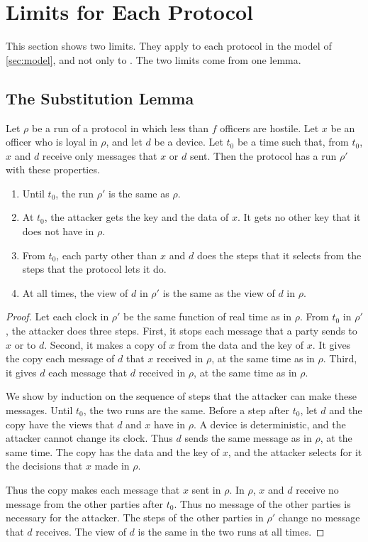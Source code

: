 \section{Limits for Each Protocol}
\label{sec:limits}

This section shows two limits. They apply to each protocol in the model of
\cref{sec:model}, and not only to \sys{}. The two limits come from one lemma.

\subsection{The Substitution Lemma}

\begin{lem}[Substitution]
\label{lem:subst}
Let $\rho$ be a run of a protocol in which less than $f$ officers are hostile. Let $x$ be
an officer who is loyal in $\rho$, and let $d$ be a device. Let $t_0$ be a time such that,
from $t_0$, $x$ and $d$ receive only messages that $x$ or $d$ sent. Then the protocol has
a run $\rho'$ with these properties.
\begin{enumerate}
  \item Until $t_0$, the run $\rho'$ is the same as $\rho$.
  \item At $t_0$, the attacker gets the key and the data of $x$. It gets no other key that
  it does not have in $\rho$.
  \item From $t_0$, each party other than $x$ and $d$ does the steps that it selects from
  the steps that the protocol lets it do.
  \item At all times, the view of $d$ in $\rho'$ is the same as the view of $d$ in $\rho$.
\end{enumerate}
\end{lem}

\begin{proof}
Let each clock in $\rho'$ be the same function of real time as in $\rho$. From $t_0$ in
$\rho'$, the attacker does three steps. First, it stops each message that a party sends to
$x$ or to $d$. Second, it makes a copy of $x$ from the data and the key of
$x$. It gives the copy each message of $d$ that $x$ received in $\rho$, at the same time as
in $\rho$. Third, it gives $d$ each message that $d$ received in $\rho$, at the same time
as in $\rho$.

We show by induction on the sequence of steps that the attacker can make these messages.
Until $t_0$, the two runs are the same. Before a step after $t_0$, let $d$ and the copy
have the views that $d$ and $x$ have in $\rho$. A device is deterministic, and the attacker
cannot change its clock. Thus $d$ sends the same message as in $\rho$, at the same time.
The copy has the data and the key of $x$, and the attacker selects for it the decisions
that $x$ made in $\rho$.

Thus the copy makes each message that $x$ sent in $\rho$. In $\rho$, $x$ and $d$ receive
no message from the other parties after $t_0$. Thus no message of the other parties is
necessary for the attacker. The steps of the other parties in $\rho'$ change no message
that $d$ receives. The view of $d$ is the same in the two runs at all times.
\end{proof}

